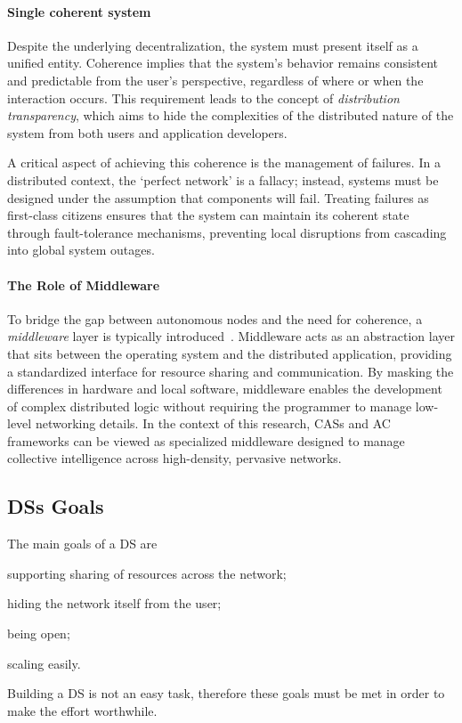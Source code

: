 \paragraph{Single coherent system}
Despite the underlying decentralization, the system must present itself as a unified entity. Coherence implies that the system's behavior remains consistent and predictable from the user's perspective, regardless of where or when the interaction occurs. This requirement leads to the concept of \emph{distribution transparency}, which aims to hide the complexities of the distributed nature of the system from both users and application developers.

A critical aspect of achieving this coherence is the management of failures. In a distributed context, the `perfect network' is a fallacy; instead, systems must be designed under the assumption that components will fail. Treating failures as first-class citizens ensures that the system can maintain its coherent state through fault-tolerance mechanisms, preventing local disruptions from cascading into global system outages.

\paragraph{The Role of Middleware}
To bridge the gap between autonomous nodes and the need for coherence, a \emph{middleware} layer is typically introduced~\cite{Bernstein_1996}. Middleware acts as an abstraction layer that sits between the operating system and the distributed application, providing a standardized interface for resource sharing and communication. By masking the differences in hardware and local software, middleware enables the development of complex distributed logic without requiring the programmer to manage low-level networking details. In the context of this research, \acp{CAS} and \ac{AC} frameworks can be viewed as specialized middleware designed to manage collective intelligence across high-density, pervasive networks.

\subsection{\aclp{DS} Goals}

The main goals of a \ac{DS} are
%
\begin{inlinelist}
    \item supporting sharing of resources across the network;
    \item hiding the network itself from the user;
    \item being open;
    \item scaling easily.
\end{inlinelist}
%
Building a \ac{DS} is not an easy task, therefore these goals must be met in order to make the effort worthwhile.

